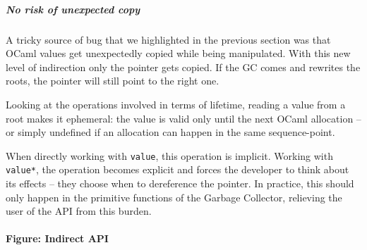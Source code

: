 \documentclass[a4paper]{easychair}
\begin{document}
\hypertarget{no-risk-of-unexpected-copy}{%
\subparagraph{No risk of unexpected
copy}\label{no-risk-of-unexpected-copy}}

A tricky source of bug that we highlighted in the previous section was
that OCaml values get unexpectedly copied while being manipulated. With
this new level of indirection only the pointer gets copied. If the GC
comes and rewrites the roots, the pointer will still point to the right
one.

Looking at the operations involved in terms of lifetime, reading a value
from a root makes it ephemeral: the value is valid only until the next
OCaml allocation -- or simply undefined if an allocation can happen in
the same sequence-point.

When directly working with \texttt{value}, this operation is implicit.
Working with \texttt{value*}, the operation becomes explicit and forces
the developer to think about its effects -- they choose when to
dereference the pointer. In practice, this should only happen in the
primitive functions of the Garbage Collector, relieving the user of the
API from this burden.

\hypertarget{figure-indirect-api}{%
\paragraph{Figure: Indirect API}\label{figure-indirect-api}}

\begin{Shaded}
\begin{Highlighting}[]
 
    
\end{Highlighting}
\end{Shaded}
\end{document}
